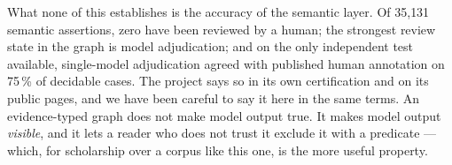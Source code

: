 What none of this establishes is the accuracy of the semantic layer. Of 35{,}131
semantic assertions, zero have been reviewed by a human; the strongest review state
in the graph is model adjudication; and on the only independent test available,
single-model adjudication agreed with published human annotation on 75\,\% of
decidable cases. The project says so in its own certification and on its public
pages, and we have been careful to say it here in the same terms. An
evidence-typed graph does not make model output true. It makes model output
\emph{visible}, and it lets a reader who does not trust it exclude it with a
predicate --- which, for scholarship over a corpus like this one, is the more useful
property.
